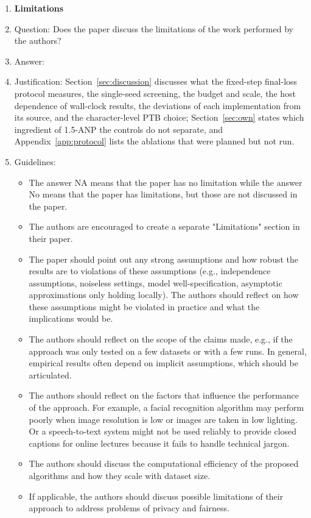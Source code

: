 \documentclass{article}
\begin{document}
\begin{enumerate}
\item {\bf Limitations}
    \item[] Question: Does the paper discuss the limitations of the work performed by the authors?
    \item[] Answer: \answerYes{}
    \item[] Justification: Section~\ref{sec:discussion} discusses what the fixed-step final-loss protocol measures, the single-seed screening, the budget and scale, the host dependence of wall-clock results, the deviations of each implementation from its source, and the character-level PTB choice; Section~\ref{sec:own} states which ingredient of 1.5-ANP the controls do not separate, and Appendix~\ref{app:protocol} lists the ablations that were planned but not run.
    \item[] Guidelines:
    \begin{itemize}
        \item The answer NA means that the paper has no limitation while the answer No means that the paper has limitations, but those are not discussed in the paper.
        \item The authors are encouraged to create a separate "Limitations" section in their paper.
        \item The paper should point out any strong assumptions and how robust the results are to violations of these assumptions (e.g., independence assumptions, noiseless settings, model well-specification, asymptotic approximations only holding locally). The authors should reflect on how these assumptions might be violated in practice and what the implications would be.
        \item The authors should reflect on the scope of the claims made, e.g., if the approach was only tested on a few datasets or with a few runs. In general, empirical results often depend on implicit assumptions, which should be articulated.
        \item The authors should reflect on the factors that influence the performance of the approach. For example, a facial recognition algorithm may perform poorly when image resolution is low or images are taken in low lighting. Or a speech-to-text system might not be used reliably to provide closed captions for online lectures because it fails to handle technical jargon.
        \item The authors should discuss the computational efficiency of the proposed algorithms and how they scale with dataset size.
        \item If applicable, the authors should discuss possible limitations of their approach to address problems of privacy and fairness.

\end{itemize}
\end{enumerate}
\end{document}

